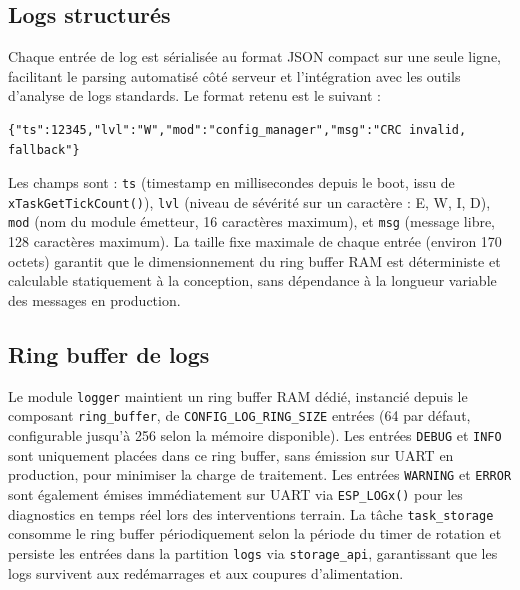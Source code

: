 \subsection{Logs structurés}
\label{subsec:logstruct}

Chaque entrée de log est sérialisée au format JSON compact sur une
seule ligne, facilitant le parsing automatisé côté serveur et
l'intégration avec les outils d'analyse de logs standards. Le format
retenu est le suivant :

\begin{verbatim}
{"ts":12345,"lvl":"W","mod":"config_manager","msg":"CRC invalid, fallback"}
\end{verbatim}

Les champs sont : \texttt{ts} (timestamp en millisecondes depuis le
boot, issu de \texttt{xTaskGetTickCount()}), \texttt{lvl} (niveau de
sévérité sur un caractère : E, W, I, D), \texttt{mod} (nom du module
émetteur, 16 caractères maximum), et \texttt{msg} (message libre,
128 caractères maximum). La taille fixe maximale de chaque entrée
(environ 170 octets) garantit que le dimensionnement du ring buffer
RAM est déterministe et calculable statiquement à la conception, sans
dépendance à la longueur variable des messages en production.

\subsection{Ring buffer de logs}
\label{subsec:logring}

Le module \texttt{logger} maintient un ring buffer RAM dédié,
instancié depuis le composant \texttt{ring\_buffer}, de
\texttt{CONFIG\_LOG\_RING\_SIZE} entrées (64 par défaut, configurable
jusqu'à 256 selon la mémoire disponible). Les entrées \texttt{DEBUG}
et \texttt{INFO} sont uniquement placées dans ce ring buffer, sans
émission sur UART en production, pour minimiser la charge de traitement.
Les entrées \texttt{WARNING} et \texttt{ERROR} sont également émises
immédiatement sur UART via \texttt{ESP\_LOGx()} pour les diagnostics
en temps réel lors des interventions terrain. La tâche
\texttt{task\_storage} consomme le ring buffer périodiquement selon
la période du timer de rotation et persiste les entrées dans la
partition \texttt{logs} via \texttt{storage\_api}, garantissant que
les logs survivent aux redémarrages et aux coupures d'alimentation.

